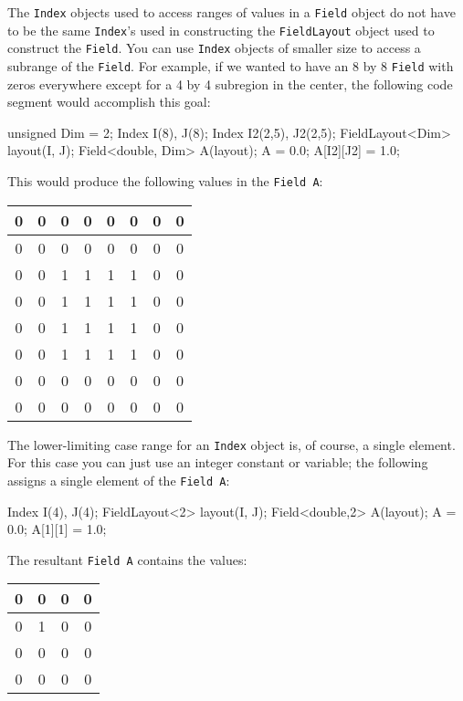 The \texttt{Index} objects used to access ranges of values in a \texttt{Field} object do not have to be the same \texttt{Index}'s used in constructing the \texttt{FieldLayout} object used to construct the \texttt{Field}. You can use \texttt{Index} objects of smaller size to access a subrange of the \texttt{Field}. For example, if we wanted to have an 8 by 8 \texttt{Field} with zeros everywhere except for a 4 by 4 subregion in the center, the following code segment would accomplish this goal: \\
\begin{code}
unsigned Dim = 2;
Index I(8), J(8);
Index I2(2,5), J2(2,5);
FieldLayout<Dim> layout(I, J);
Field<double, Dim> A(layout);
A = 0.0;
A[I2][J2] = 1.0;
\end{code}
This would produce the following values in the \texttt{Field A}:
%
   \begin{center}
        \begin{tabular}{|c|c|c|c|c|c|c|c|}
        \hline
        0 & 0 & 0 & 0 & 0 & 0 & 0 & 0 \\        \hline
        0 & 0 & 0 & 0 & 0 & 0 & 0 & 0 \\        \hline
        0 & 0 & 1 & 1 & 1 & 1 & 0 & 0 \\        \hline
        0 & 0 & 1 & 1 & 1 & 1 & 0 & 0 \\        \hline
        0 & 0 & 1 & 1 & 1 & 1 & 0 & 0 \\        \hline
        0 & 0 & 1 & 1 & 1 & 1 & 0 & 0 \\        \hline
        0 & 0 & 0 & 0 & 0 & 0 & 0 & 0 \\        \hline
        0 & 0 & 0 & 0 & 0 & 0 & 0 & 0 \\        \hline
        \end{tabular}
   \label{tbl:t2}
   \end{center}

The lower-limiting case range for an \texttt{Index} object is, of course, a single element. For this case you can just use an integer constant or variable; the following assigns a single element of the \texttt{Field A}: \\
\begin{code}
Index I(4), J(4);
FieldLayout<2> layout(I, J);
Field<double,2> A(layout);
A = 0.0;
A[1][1] = 1.0;
\end{code}
The resultant \texttt{Field A} contains the values:
%
   \begin{center}
        \begin{tabular}{|c|c|c|c|}
        \hline
        0 & 0 & 0 & 0 \\        \hline
        0 & 1 & 0 & 0 \\        \hline
        0 & 0 & 0 & 0 \\        \hline
        0 & 0 & 0 & 0 \\        \hline
        \end{tabular}
   \label{tbl:t2}
   \end{center}

